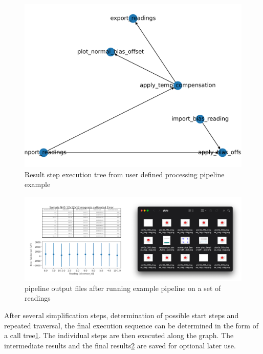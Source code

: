 \begin{figure}
\centering
\includegraphics{./generated_images/border_Result_step_execution_tree_from_user_defined_processing_pipeline_example.png}
\caption{Result step execution tree from user defined processing
pipeline example
\label{Result_step_execution_tree_from_user_defined_processing_pipeline_example.png}}
\end{figure}

\begin{figure}
\centering
\includegraphics{./generated_images/border_pipeline_output_files_after_running_example_pipeline_on_a_set_of_readings.png}
\caption{pipeline output files after running example pipeline on a set
of readings
\label{pipeline_output_files_after_running_example_pipeline_on_a_set_of_readings.png}}
\end{figure}

After several simplification steps, determination of possible start
steps and repeated traversal, the final execution sequence can be
determined in the form of a call
tree\ref{Result_step_execution_tree_from_user_defined_processing_pipeline_example.png}.
The individual steps are then executed along the graph. The intermediate
results and the final
results\ref{pipeline_output_files_after_running_example_pipeline_on_a_set_of_readings.png}
are saved for optional later use.

